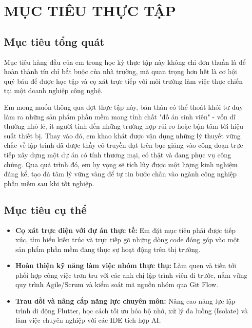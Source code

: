 \documentclass[12pt, a4paper]{article}
\begin{document}
\section{MỤC TIÊU THỰC TẬP}
\subsection{Mục tiêu tổng quát}
Mục tiêu hàng đầu của em trong học kỳ thực tập này không chỉ đơn thuần là để hoàn thành tín chỉ bắt buộc của nhà trường, mà quan trọng hơn hết là cơ hội quý báu để được học tập và cọ xát trực tiếp với môi trường làm việc thực chiến tại một doanh nghiệp công nghệ. 

Em mong muốn thông qua đợt thực tập này, bản thân có thể thoát khỏi tư duy làm ra những sản phẩm phần mềm mang tính chất "đồ án sinh viên" - vốn dĩ thường nhỏ lẻ, ít người tính đến những trường hợp rủi ro hoặc bận tâm tới hiệu suất thiết bị. Thay vào đó, em khao khát được vận dụng những lý thuyết vững chắc về lập trình đã được thầy cô truyền đạt trên bục giảng vào công đoạn trực tiếp xây dựng một dự án có tính thương mại, có thật và đang phục vụ công chúng. Qua quá trình đó, em hy vọng sẽ tích lũy được một lượng kinh nghiệm đáng kể, tạo đà tâm lý vững vàng để tự tin bước chân vào ngành công nghiệp phần mềm sau khi tốt nghiệp.

\subsection{Mục tiêu cụ thể}
\begin{itemize}
    \item \textbf{Cọ xát trực diện với dự án thực tế:} Em đặt mục tiêu phải được tiếp xúc, tìm hiểu kiến trúc và trực tiếp gõ những dòng code đóng góp vào một sản phẩm phần mềm đang thực sự hoạt động trên thị trường.
    \item \textbf{Hoàn thiện kỹ năng làm việc nhóm thực thụ:} Làm quen và tiến tới phối hợp công việc trơn tru với các anh chị lập trình viên đi trước, nắm vững quy trình Agile/Scrum và kiểm soát mã nguồn nhóm qua Git Flow.
    \item \textbf{Trau dồi và nâng cấp năng lực chuyên môn:} Nâng cao năng lực lập trình di động Flutter, học cách tối ưu hóa bộ nhớ, xử lý đa luồng (Isolate) và làm việc chuyên nghiệp với các IDE tích hợp AI.
\end{itemize}
\end{document}
